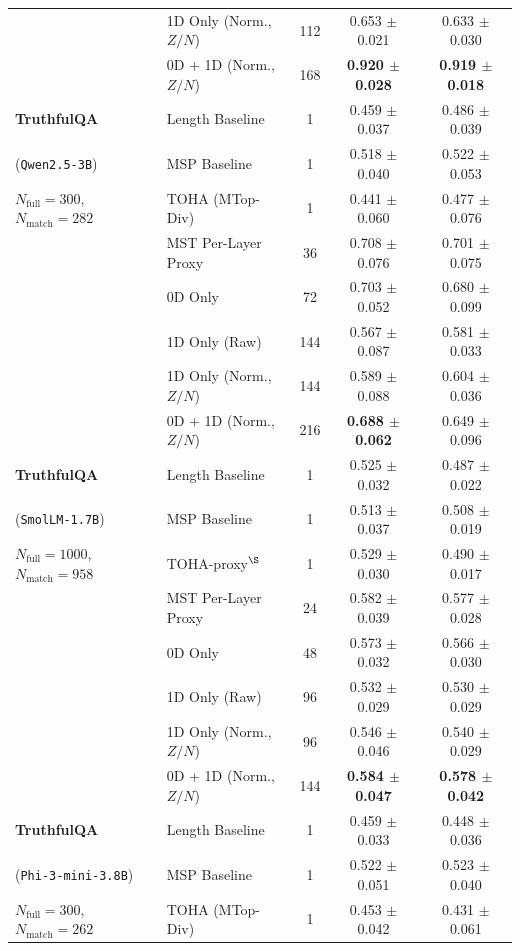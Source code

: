 \documentclass{article}
\begin{document}
\begin{table}[ht]
{\begin{tabular}{llccc}
 & 1D Only (Norm., $Z/N$) & 112 & 0.653 $\pm$ 0.021 & 0.633 $\pm$ 0.030 \\
 & 0D + 1D (Norm., $Z/N$) & 168 & \textbf{0.920 $\pm$ 0.028} & \textbf{0.919 $\pm$ 0.018} \\
\midrule
\textbf{TruthfulQA} & Length Baseline & 1 & 0.459 $\pm$ 0.037 & 0.486 $\pm$ 0.039 \\
(\texttt{Qwen2.5-3B}) & MSP Baseline & 1 & 0.518 $\pm$ 0.040 & 0.522 $\pm$ 0.053 \\
$N_{\text{full}}{=}300$, $N_{\text{match}}{=}282$ & TOHA (MTop-Div) & 1 & 0.441 $\pm$ 0.060 & 0.477 $\pm$ 0.076 \\
 & MST Per-Layer Proxy & 36 & 0.708 $\pm$ 0.076 & 0.701 $\pm$ 0.075 \\
 & 0D Only & 72 & 0.703 $\pm$ 0.052 & 0.680 $\pm$ 0.099 \\
 & 1D Only (Raw) & 144 & 0.567 $\pm$ 0.087 & 0.581 $\pm$ 0.033 \\
 & 1D Only (Norm., $Z/N$) & 144 & 0.589 $\pm$ 0.088 & 0.604 $\pm$ 0.036 \\
 & 0D + 1D (Norm., $Z/N$) & 216 & \textbf{0.688 $\pm$ 0.062} & 0.649 $\pm$ 0.096 \\
\midrule
\textbf{TruthfulQA} & Length Baseline & 1 & 0.525 $\pm$ 0.032 & 0.487 $\pm$ 0.022 \\
(\texttt{SmolLM-1.7B}) & MSP Baseline & 1 & 0.513 $\pm$ 0.037 & 0.508 $\pm$ 0.019 \\
$N_{\text{full}}{=}1000$, $N_{\text{match}}{=}958$ & TOHA-proxy$^\S$ & 1 & 0.529 $\pm$ 0.030 & 0.490 $\pm$ 0.017 \\
 & MST Per-Layer Proxy & 24 & 0.582 $\pm$ 0.039 & 0.577 $\pm$ 0.028 \\
 & 0D Only & 48 & 0.573 $\pm$ 0.032 & 0.566 $\pm$ 0.030 \\
 & 1D Only (Raw) & 96 & 0.532 $\pm$ 0.029 & 0.530 $\pm$ 0.029 \\
 & 1D Only (Norm., $Z/N$) & 96 & 0.546 $\pm$ 0.046 & 0.540 $\pm$ 0.029 \\
 & 0D + 1D (Norm., $Z/N$) & 144 & \textbf{0.584 $\pm$ 0.047} & \textbf{0.578 $\pm$ 0.042} \\
\midrule
\textbf{TruthfulQA} & Length Baseline & 1 & 0.459 $\pm$ 0.033 & 0.448 $\pm$ 0.036 \\
(\texttt{Phi-3-mini-3.8B}) & MSP Baseline & 1 & 0.522 $\pm$ 0.051 & 0.523 $\pm$ 0.040 \\
$N_{\text{full}}{=}300$, $N_{\text{match}}{=}262$ & TOHA (MTop-Div) & 1 & 0.453 $\pm$ 0.042 & 0.431 $\pm$ 0.061 \\

\end{tabular}}
\end{table}
\end{document}
